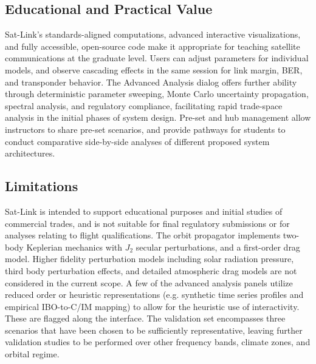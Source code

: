 \documentclass[telecom,article,submit,pdftex,moreauthors]{Definitions/mdpi}
\begin{document}
\subsection{Educational and Practical Value}

Sat-Link's standards-aligned computations, advanced interactive visualizations, and fully accessible, open-source code make it appropriate for teaching satellite communications at the graduate level. Users can adjust parameters for individual models, and observe cascading effects in the same session for link margin, BER, and transponder behavior. The Advanced Analysis dialog offers further ability through deterministic parameter sweeping, Monte Carlo uncertainty propagation, spectral analysis, and regulatory compliance, facilitating rapid trade-space analysis in the initial phases of system design. Pre-set and hub management allow instructors to share pre-set scenarios, and provide pathways for students to conduct comparative side-by-side analyses of different proposed system architectures.

\subsection{Limitations}

Sat-Link is intended to support educational purposes and initial studies of commercial trades, and is not suitable for final regulatory submissions or for analyses relating to flight qualifications. The orbit propagator implements two-body Keplerian mechanics with $J_2$ secular perturbations, and a first-order drag model. Higher fidelity perturbation models including solar radiation pressure, third body perturbation effects, and detailed atmospheric drag models are not considered in the current scope. A few of the advanced analysis panels utilize reduced order or heuristic representations (e.g. synthetic time series profiles and empirical IBO-to-C/IM mapping) to allow for the heuristic use of interactivity. These are flagged along the interface. The validation set encompasses three scenarios that have been chosen to be sufficiently representative, leaving further validation studies to be performed over other frequency bands, climate zones, and orbital regime.

\end{document}
